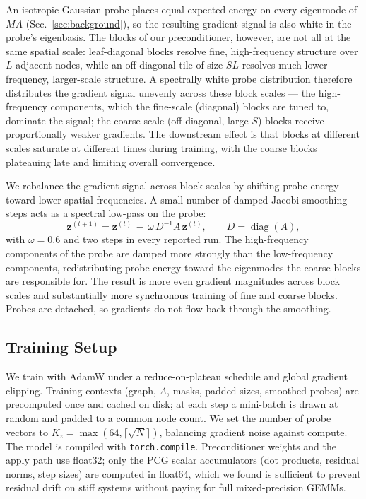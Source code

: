 \documentclass[acmtog]{acmart}
\theoremstyle{plain}
\begin{document}
An isotropic Gaussian probe places equal expected energy on every eigenmode of $MA$
(Sec.~\ref{sec:background}), so the resulting gradient signal is also white in the probe's
eigenbasis. The blocks of our preconditioner, however, are not all at the same spatial
scale: leaf-diagonal blocks resolve fine, high-frequency structure over $L$ adjacent nodes,
while an off-diagonal tile of size $SL$ resolves much lower-frequency, larger-scale
structure. A spectrally white probe distribution therefore distributes the gradient signal
unevenly across these block scales --- the high-frequency components, which the
fine-scale (diagonal) blocks are tuned to, dominate the signal; the coarse-scale
(off-diagonal, large-$S$) blocks receive proportionally weaker gradients. The downstream
effect is that blocks at different scales saturate at different times during training, with
the coarse blocks plateauing late and limiting overall convergence.

We rebalance the gradient signal across block scales by shifting probe energy toward lower
spatial frequencies. A small number of damped-Jacobi smoothing steps acts as a spectral
low-pass on the probe:
\begin{equation}
  \mathbf{z}^{(t+1)} = \mathbf{z}^{(t)} \,-\, \omega\,D^{-1} A\,\mathbf{z}^{(t)},\qquad
  D = \operatorname{diag}(A),
  \label{eq:jacobi_smooth}
\end{equation}
with $\omega\!=\!0.6$ and two steps in every reported run. The high-frequency components of
the probe are damped more strongly than the low-frequency components, redistributing probe
energy toward the eigenmodes the coarse blocks are responsible for. The result is more
even gradient magnitudes across block scales and substantially more synchronous training of
fine and coarse blocks. Probes are detached, so gradients do not flow back through the
smoothing.

\subsection{Training Setup}

We train with AdamW under a reduce-on-plateau schedule and global gradient clipping. Training
contexts (graph, $A$, masks, padded sizes, smoothed probes) are precomputed once and cached
on disk; at each step a mini-batch is drawn at random and padded to a common node count. We
set the number of probe vectors to $K_z = \max(64,\lceil\sqrt{N}\rceil)$, balancing gradient
noise against compute. The model is compiled with \verb|torch.compile|. Preconditioner
weights and the apply path use float32; only the PCG scalar accumulators (dot products,
residual norms, step sizes) are computed in float64, which we found is sufficient to
prevent residual drift on stiff systems without paying for full mixed-precision GEMMs.
\end{document}

